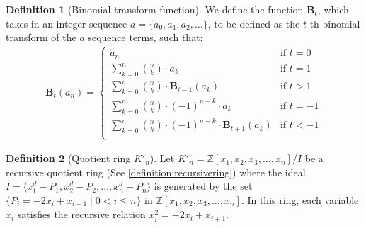 \documentclass{article}
\theoremstyle{plain}
\theoremstyle{definition}
\newtheorem{definition}{Definition}
\newcommand{\Z}{\mathbb{Z}}
\newcommand{\K}{K}
\newcommand{\BT}{\textbf{B}}
\begin{document}
\begin{definition}[Binomial transform function] \label{definition:binomialtransforms}
We define the function $\BT_t$, which takes in an integer sequence $a = \{ a_0, a_1, a_2, \ldots \}$, to be defined as the $t$-th binomial transform of the $a$ sequence terms, such that:
\begin{align*}
    \BT_{t}(a_n) =
    \begin{cases}
        a_n &\text{if } t = 0 \\
        \sum_{k=0}^{n} \binom{n}{k} \cdot a_k &\text{if } t = 1 \\
        \sum_{k=0}^{n} \binom{n}{k} \cdot \BT_{t-1}(a_k) &\text{if } t > 1 \\
        \sum_{k=0}^{n} \binom{n}{k} \cdot (-1)^{n-k} \cdot a_k  &\text{if } t = -1 \\
        \sum_{k=0}^{n} \binom{n}{k} \cdot (-1)^{n-k} \cdot \BT_{t+1}(a_k) &\text{if } t < -1 \\
    \end{cases}
\end{align*}
\end{definition}

\begin{definition}[Quotient ring $\K'_n$] \label{definition:ring2}
Let $\K'_n = \Z[x_1, x_2, x_3, \ldots, x_n]/I$ be a recursive quotient ring (See \cref{definition:recursivering}) where the ideal \( I = \langle x_1^d - P_1, x_2^d - P_2, \ldots, x_n^d - P_n \rangle \) is generated by the set $\{P_i = -2x_i + x_{i+1} \mid 0 < i \leq n \}$ in $\Z[x_1, x_2, x_3, \ldots, x_n]$. In this ring, each variable $x_i$ satisfies the recursive relation $x_i^2 = -2x_i + x_{i+1}$.
\end{definition}
\end{document}
